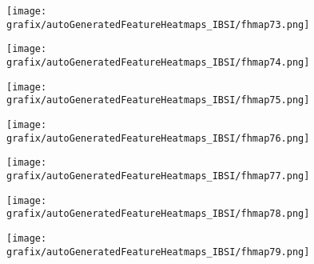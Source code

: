 \hspace{\hsp} 
\begin{subfigure}{\wid\textwidth} 
    \centering 
    \caption{\tiny \sffamily {}} 
    \vspace{\vsp} 
    \texttt{[image: grafix/autoGeneratedFeatureHeatmaps\_IBSI/fhmap73.png]} 
\end{subfigure} 
\hspace{\hsp} 
\begin{subfigure}{\wid\textwidth} 
    \centering 
    \caption{\tiny \sffamily {}} 
    \vspace{\vsp} 
    \texttt{[image: grafix/autoGeneratedFeatureHeatmaps\_IBSI/fhmap74.png]} 
\end{subfigure} 
\hspace{\hsp} 
\begin{subfigure}{\wid\textwidth} 
    \centering 
    \caption{\tiny \sffamily {}} 
    \vspace{\vsp} 
    \texttt{[image: grafix/autoGeneratedFeatureHeatmaps\_IBSI/fhmap75.png]} 
\end{subfigure} 
\hspace{\hsp} 
\begin{subfigure}{\wid\textwidth} 
    \centering 
    \caption{\tiny \sffamily {}} 
    \vspace{\vsp} 
    \texttt{[image: grafix/autoGeneratedFeatureHeatmaps\_IBSI/fhmap76.png]} 
\end{subfigure} 
\hspace{\hsp} 
\begin{subfigure}{\wid\textwidth} 
    \centering 
    \caption{\tiny \sffamily {}} 
    \vspace{\vsp} 
    \texttt{[image: grafix/autoGeneratedFeatureHeatmaps\_IBSI/fhmap77.png]} 
\end{subfigure} 
\hspace{\hsp} 
\begin{subfigure}{\wid\textwidth} 
    \centering 
    \caption{\tiny \sffamily {}} 
    \vspace{\vsp} 
    \texttt{[image: grafix/autoGeneratedFeatureHeatmaps\_IBSI/fhmap78.png]} 
\end{subfigure} 
\hspace{\hsp} 
\begin{subfigure}{\wid\textwidth} 
    \centering 
    \caption{\tiny \sffamily {}} 
    \vspace{\vsp} 
    \texttt{[image: grafix/autoGeneratedFeatureHeatmaps\_IBSI/fhmap79.png]} 
\end{subfigure} 
